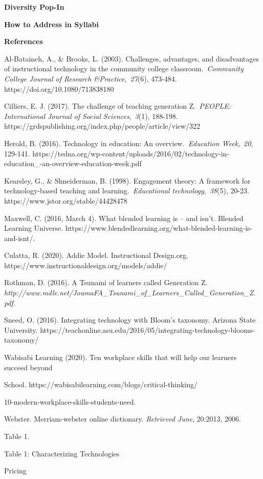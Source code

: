 \documentclass{book}
\begin{document}
\textbf{Diversity Pop-In}

\textbf{How to Address in Syllabi}

\textbf{References}

Al-Bataineh, A., \& Brooks, L. (2003). Challenges, advantages, and
disadvantages of instructional technology in the community college
classroom.~\emph{Community College Journal of Research
\&Practice},~\emph{27}(6), 473-484. https://doi.org/10.1080/713838180

Cilliers, E. J. (2017). The challenge of teaching generation Z.~\emph{PEOPLE:
International Journal of Social Sciences},~\emph{3}(1), 188-198.
https://grdspublishing.org/index.php/people/article/view/322

Herold, B. (2016). Technology in education: An overview.~\emph{Education
Week},~\emph{20}, 129-141.
https://tedna.org/wp-content/uploads/2016/02/technology-in-education\_-an-overview-education-week.pdf

Kearsley, G., \& Shneiderman, B. (1998). Engagement theory: A framework for
technology-based teaching and learning.~\emph{Educational
technology},~\emph{38}(5), 20-23. https://www.jstor.org/stable/44428478

Maxwell, C. (2016, March 4). What blended learning is -- and isn't. Blended
Learning Universe.
https://www.blendedlearning.org/what-blended-learning-is-and-isnt/.

Culatta, R. (2020). Addie Model. Instructional Design.org.
https://www.instructionaldesign.org/models/addie/

Rothman, D. (2016). A Tsunami of learners called Generation Z.
\emph{http://www.mdle.net/JoumaFA\_Tsunami\_of\_Learners\_Called\_Generation\_Z.
pdf}.

Sneed, O. (2016). Integrating technology with Bloom's taxonomy. Arizona State
University.
https://teachonline.asu.edu/2016/05/integrating-technology-blooms-taxonomy/

Wabisabi Learning (2020). Ten workplace skills that will help our learners
succeed beyond

School. https://wabisabilearning.com/blogs/critical-thinking/

10-modern-workplace-skills-students-need.

Webster. Merriam-webster online dictionary. \emph{Retrieved June}, 20:2013,
2006.

Table 1.

Table 1: Characterizing Technologies

Pricing
\end{document}
